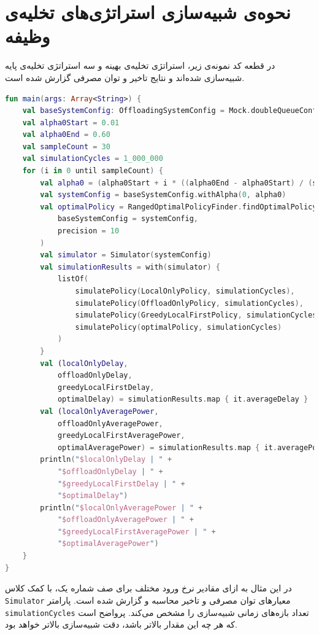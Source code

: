 \section{نحوه‌ی شبیه‌سازی استراتژی‌های تخلیه‌ی وظیفه}
در قطعه کد نمونه‌ی زیر، استراتژی تخلیه‌ی بهینه و سه استراتژی تخلیه‌ی پایه شبیه‌سازی شده‌اند و نتایج تاخیر و توان مصرفی گزارش شده است.
\begin{LTR}
	\begin{lstlisting}[language=Kotlin, caption={شبیه‌سازی استراتژی‌های تخلیه‌ی وظیفه}, captiondirection=RTL, label={lst:sim}, showstringspaces=false]
fun main(args: Array<String>) {
	val baseSystemConfig: OffloadingSystemConfig = Mock.doubleQueueConfig()
	val alpha0Start = 0.01
	val alpha0End = 0.60
	val sampleCount = 30
	val simulationCycles = 1_000_000
	for (i in 0 until sampleCount) {
		val alpha0 = (alpha0Start + i * ((alpha0End - alpha0Start) / (sampleCount - 1)))
		val systemConfig = baseSystemConfig.withAlpha(0, alpha0)
		val optimalPolicy = RangedOptimalPolicyFinder.findOptimalPolicy(
			baseSystemConfig = systemConfig,
			precision = 10
		)
		val simulator = Simulator(systemConfig)
		val simulationResults = with(simulator) {
			listOf(
				simulatePolicy(LocalOnlyPolicy, simulationCycles),
				simulatePolicy(OffloadOnlyPolicy, simulationCycles),
				simulatePolicy(GreedyLocalFirstPolicy, simulationCycles),
				simulatePolicy(optimalPolicy, simulationCycles)
			)
		}
		val (localOnlyDelay,
			offloadOnlyDelay,
			greedyLocalFirstDelay,
			optimalDelay) = simulationResults.map { it.averageDelay }
		val (localOnlyAveragePower,
			offloadOnlyAveragePower,
			greedyLocalFirstAveragePower,
			optimalAveragePower) = simulationResults.map { it.averagePowerConsumption }
		println("$localOnlyDelay | " +
			"$offloadOnlyDelay | " +
			"$greedyLocalFirstDelay | " +
			"$optimalDelay")
		println("$localOnlyAveragePower | " +
			"$offloadOnlyAveragePower | " +
			"$greedyLocalFirstAveragePower | " +
			"$optimalAveragePower")
	}
}
	\end{lstlisting}
\end{LTR}
در این مثال به ازای مقادیر نرخ ورود مختلف برای صف شماره یک، با کمک کلاس \texttt{\footnotesize Simulator} معیارهای توان مصرفی و تاخیر محاسبه و گزارش شده است. پارامتر \texttt{\footnotesize simulationCycles} تعداد بازه‌های زمانی شبیه‌سازی را مشخص می‌کند. پرواضح است که هر چه این مقدار بالاتر باشد، دقت شبیه‌سازی بالاتر خواهد بود. 
\newpage